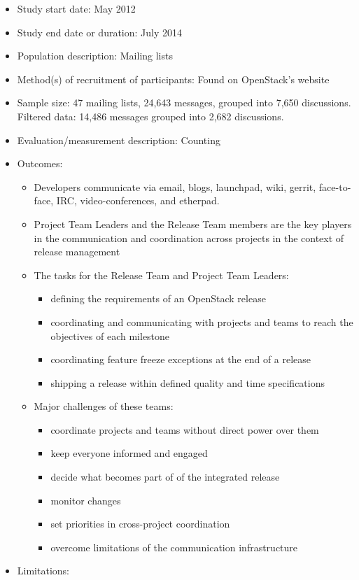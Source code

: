 \documentclass[]{book}
\providecommand{\tightlist}{%
  \setlength{\itemsep}{0pt}\setlength{\parskip}{0pt}}
\begin{document}
\begin{itemize}
\tightlist
\item
  Study start date: May 2012
\item
  Study end date or duration: July 2014
\item
  Population description: Mailing lists
\item
  Method(s) of recruitment of participants: Found on OpenStack's website
\item
  Sample size: 47 mailing lists, 24,643 messages, grouped into 7,650
  discussions. Filtered data: 14,486 messages grouped into 2,682
  discussions.
\item
  Evaluation/measurement description: Counting
\item
  Outcomes:

  \begin{itemize}
  \tightlist
  \item
    Developers communicate via email, blogs, launchpad, wiki, gerrit,
    face-to-face, IRC, video-conferences, and etherpad.
  \item
    Project Team Leaders and the Release Team members are the key
    players in the communication and coordination across projects in the
    context of release management
  \item
    The tasks for the Release Team and Project Team Leaders:

    \begin{itemize}
    \tightlist
    \item
      defining the requirements of an OpenStack release
    \item
      coordinating and communicating with projects and teams to reach
      the objectives of each milestone
    \item
      coordinating feature freeze exceptions at the end of a release
    \item
      shipping a release within defined quality and time specifications
    \end{itemize}
  \item
    Major challenges of these teams:

    \begin{itemize}
    \tightlist
    \item
      coordinate projects and teams without direct power over them
    \item
      keep everyone informed and engaged
    \item
      decide what becomes part of of the integrated release
    \item
      monitor changes
    \item
      set priorities in cross-project coordination
    \item
      overcome limitations of the communication infrastructure
    \end{itemize}
  \end{itemize}
\item
  Limitations:


\end{itemize}
\end{document}
